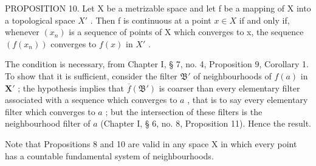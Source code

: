 PROPOSITION 10. Let X be a metrizable space and let f be a mapping of X into a topological space \(X'\) . Then f is continuous at a point \(x \in X\) if and only if, whenever \((x_n)\) is a sequence of points of X which converges to x, the sequence \((f(x_n))\) converges to \(f(x)\) in \(X'\) .

The condition is necessary, from Chapter I, § 7, no. 4, Proposition 9, Corollary 1. To show that it is sufficient, consider the filter \(\mathfrak{B}'\) of neighbourhoods of \(f(a)\) in \(\mathbf{X}'\) ; the hypothesis implies that \(\overline{f}(\mathfrak{B}')\) is coarser than every elementary filter associated with a sequence which converges to \(a\) , that is to say every elementary filter which converges to \(a\) ; but the intersection of these filters is the neighbourhood filter of \(a\) (Chapter I, § 6, no. 8, Proposition 11). Hence the result.

Note that Propositions 8 and 10 are valid in any space X in which every point has a countable fundamental system of neighbourhoods.

